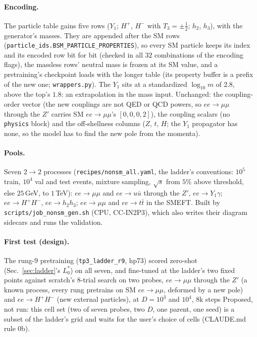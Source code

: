 \documentclass[11pt]{article}
\newcommand{\code}[1]{\texttt{#1}}
\begin{document}
\paragraph{Encoding.} The particle table gains five rows ($Y_1$; $H^+$, $H^-$ with $T_3=\pm\tfrac12$; $h_2$, $h_3$),
with the generator's masses. They are appended after the SM rows (\code{particle\_ids.BSM\_PARTICLE\_PROPERTIES}), so
every SM particle keeps its index and its encoded row bit for bit (checked in all $32$ combinations of the encoding
flags), the massless rows' neutral mass is frozen at its SM value, and a pretraining's checkpoint loads with the longer
table (its property buffer is a prefix of the new one; \code{wrappers.py}). The $Y_1$ sits at a standardized
$\log_{10}m$ of $2.8$, above the top's $1.8$: an extrapolation in the mass input. Unchanged: the coupling-order vector
(the new couplings are not QED or QCD powers, so $ee\to\mu\mu$ through the $Z'$ carries SM $ee\to\mu\mu$'s $[0,0,0,2]$),
the coupling scalars (no \code{physics} block) and the off-shellness columns ($Z$, $t$, $H$; the $Y_1$ propagator has
none, so the model has to find the new pole from the momenta).

\paragraph{Pools.} Seven $2\to2$ processes (\code{recipes/nonsm\_all.yaml}, the ladder's conventions: $10^5$ train,
$10^4$ val and test events, mixture sampling, $\sqrt s$ from $5\%$ above threshold, else $25$\,GeV, to $1$\,TeV):
$ee\to\mu\mu$ and $ee\to u\bar u$ through the $Z'$, $ee\to Y_1\gamma$; $ee\to H^+H^-$, $ee\to h_2h_3$; $ee\to\mu\mu$ and
$ee\to t\bar t$ in the SMEFT. Built by \code{scripts/job\_nonsm\_gen.sh} (CPU, CC-IN2P3), which also writes their
diagram sidecars and runs the validation.

\paragraph{First test (design).} The rung-$9$ pretraining (\code{tp3\_ladder\_r9}, hp73) scored zero-shot
(Sec.~\ref{sec:ladder}'s $L_0^\ast$) on all seven, and fine-tuned at the ladder's two fixed points against scratch's
$8$-trial search on two probes, $ee\to\mu\mu$ through the $Z'$ (a known process, every rung pretrains on SM $ee\to\mu\mu$,
deformed by a new pole) and $ee\to H^+H^-$ (new external particles), at $D=10^3$ and $10^4$, $8$k steps
Proposed, not run: this cell set (two of seven probes, two $D$, one parent, one seed) is a subset of the ladder's grid
and waits for the user's choice of cells (CLAUDE.md rule 0b).
\end{document}
